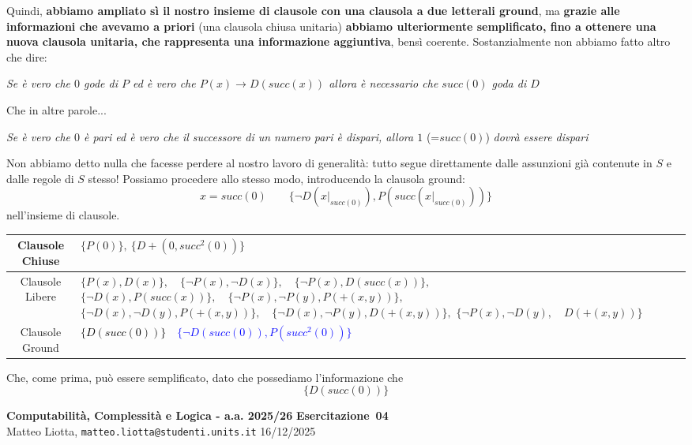 \documentclass[a4paper,10pt]{article}
\makeatletter
\newcommand{\DocType}{Esercitazione} %
\newcommand{\FullTitle}{\DocType\ \EsercitazioneNum}
\newcommand{\Header}{
\noindent
  \small \textbf{Computabilità, Complessità e Logica - a.a. 2025/26} \hfill \textbf{\FullTitle} \\[0.2cm]
  \scriptsize Matteo Liotta, \texttt{matteo.liotta@studenti.units.it} \hfill \Data \\[0.2cm]
  \noindent\makebox[\linewidth]{\rule{\linewidth}{0.4pt}} \\[0.3cm]}
\newcommand{\NewPageHeader}{
  \vfill
  \noindent\makebox[\linewidth]{\rule{\linewidth}{0.4pt}}
  \newpage
  {\Header}
}
\newcommand{\EsercitazioneNum}{04}
\newcommand{\Data}{16/12/2025}
\makeatother
\begin{document}
Quindi, \textbf{abbiamo ampliato sì il nostro insieme di clausole con una clausola a due letterali ground}, ma \textbf{grazie alle informazioni che avevamo a priori} (una clausola chiusa unitaria) \textbf{abbiamo ulteriormente semplificato, fino a ottenere una nuova clausola unitaria, che rappresenta una informazione aggiuntiva}, bensì coerente. Sostanzialmente non abbiamo fatto altro che dire:
\begin{center}
    \textit{Se è vero che $0$ gode di $P$ ed è vero che $P(x)\rightarrow D(succ(x))$ allora è necessario che $succ(0)$ goda di $D$}
\end{center}
Che in altre parole...
\begin{center}
    \textit{Se è vero che $0$ è pari ed è vero che il successore di un numero pari è dispari, allora $1$ }(=$succ(0)$)\textit{ dovrà essere dispari}
\end{center}
Non abbiamo detto nulla che facesse perdere al nostro lavoro di generalità: tutto segue direttamente dalle assunzioni già contenute in $S$ e dalle regole di $S$ stesso! Possiamo procedere allo stesso modo, introducendo la clausola ground: $$x=succ(0)\quad\quad\{\lnot D(x|_{succ(0)}), P(succ(x|_{succ(0)}))\}$$
nell'insieme di clausole.

\begin{table}[h]
    \centering
    \small 
    \renewcommand{\arraystretch}{1.5} 
    
    \begin{tabularx}{\textwidth}{|c|>{\centering\arraybackslash}X|}
        \hline
        Clausole Chiuse & $\{P(0)\}, \ \{D+(0,succ^2(0))\}$ \\
        \hline
        Clausole Libere & 
            $\{P(x), D(x)\},\quad \{\lnot P(x), \lnot D(x)\},\quad \{\lnot P(x), D(succ(x))\},$\newline
            $\{\lnot D(x), P(succ(x))\},\quad \{\lnot P(x), \lnot P(y), P(+(x, y))\},$\newline
            $\{\lnot D(x), \lnot D(y), P(+(x, y))\},\quad \{\lnot D(x), \lnot P(y), D(+(x, y))\},$\newline
            $\{\lnot P(x), \lnot D(y),\quad D(+(x, y))\}$ 
            \\
        \hline
        Clausole Ground & \textcolor{black}{$\{D(succ(0))\}\quad$}\textcolor{blue}{$\{\lnot D(succ(0)),P(succ^2(0))\}$} \\
        \hline
    \end{tabularx}
\end{table}
Che, come prima, può essere semplificato, dato che possediamo l'informazione che 
$$\{D(succ(0))\}$$
\NewPageHeader
\end{document}
